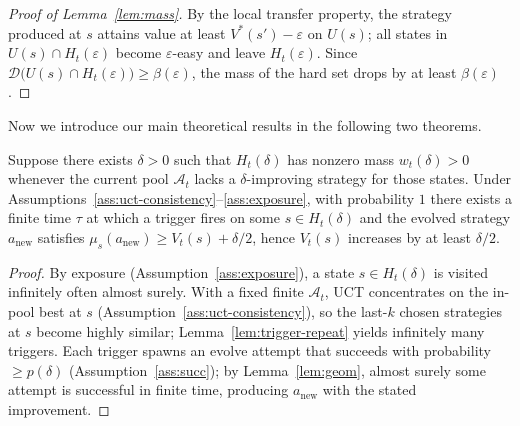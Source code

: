 \begin{proof}[Proof of Lemma~\ref{lem:mass}]
By the local transfer property, the strategy produced at $s$ attains value at least $V^*(s')-\varepsilon$ on $U(s)$; all states in $U(s)\cap H_t(\varepsilon)$ become $\varepsilon$-easy and leave $H_t(\varepsilon)$. Since $\mathcal D\big(U(s)\cap H_t(\varepsilon)\big)\ge\beta(\varepsilon)$, the mass of the hard set drops by at least $\beta(\varepsilon)$.
\end{proof}

Now we introduce our main theoretical results in the following two theorems. 

\begin{theorem}
\label{thm:eventual-discovery}
Suppose there exists $\delta>0$ such that $H_t(\delta)$ has nonzero mass $w_t(\delta)>0$ whenever the current pool $\mathcal A_t$ lacks a $\delta$-improving strategy for those states. Under Assumptions~\ref{ass:uct-consistency}--\ref{ass:exposure}, with probability $1$ there exists a finite time $\tau$ at which a trigger fires on some $s\in H_t(\delta)$ and the evolved strategy $a_{\mathrm{new}}$ satisfies
$\mu_s(a_{\mathrm{new}})\ge V_t(s)+\delta/2$,
hence $V_{t}(s)$ increases by at least $\delta/2$.
\end{theorem}

\begin{proof}
By exposure (Assumption~\ref{ass:exposure}), a state $s\in H_t(\delta)$ is visited infinitely often almost surely. With a fixed finite $\mathcal A_t$, UCT concentrates on the in-pool best at $s$ (Assumption~\ref{ass:uct-consistency}), so the last-$k$ chosen strategies at $s$ become highly similar; Lemma~\ref{lem:trigger-repeat} yields infinitely many triggers. Each trigger spawns an evolve attempt that succeeds with probability $\ge p(\delta)$ (Assumption~\ref{ass:succ}); by Lemma~\ref{lem:geom}, almost surely some attempt is successful in finite time, producing $a_{\mathrm{new}}$ with the stated improvement.
\end{proof}

